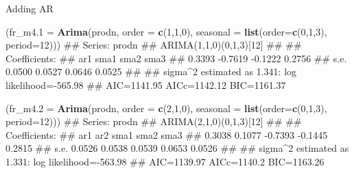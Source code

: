 \documentclass[11pt,ignorenonframetext,]{beamer}
\newenvironment{Shaded}{}{}
\newcommand{\KeywordTok}[1]{\textcolor[rgb]{0.00,0.44,0.13}{\textbf{#1}}}
\newcommand{\DataTypeTok}[1]{\textcolor[rgb]{0.56,0.13,0.00}{#1}}
\newcommand{\DecValTok}[1]{\textcolor[rgb]{0.25,0.63,0.44}{#1}}
\newcommand{\NormalTok}[1]{#1}
\let\oldShaded\Shaded
\let\endoldShaded\endShaded
\renewenvironment{Shaded}{\footnotesize\begin{spacing}{0.9}\oldShaded}{\endoldShaded\end{spacing}}
\let\oldverbatim\verbatim
\let\endoldverbatim\endverbatim
\newcommand{\scriptoutput}{
  \renewenvironment{Shaded}{\scriptsize\begin{spacing}{0.9}\oldShaded}{\endoldShaded\end{spacing}}
  \renewenvironment{verbatim}{\scriptsize\begin{spacing}{0.9}\oldverbatim}{\endoldverbatim\end{spacing}}
}
\begin{document}
\begin{frame}[fragile]{Adding AR}

\scriptoutput

\begin{Shaded}
\begin{Highlighting}[]
\NormalTok{(}\DataTypeTok{fr_m4.1 =} \KeywordTok{Arima}\NormalTok{(prodn, }\DataTypeTok{order =} \KeywordTok{c}\NormalTok{(}\DecValTok{1}\NormalTok{,}\DecValTok{1}\NormalTok{,}\DecValTok{0}\NormalTok{), }
            \DataTypeTok{seasonal =} \KeywordTok{list}\NormalTok{(}\DataTypeTok{order=}\KeywordTok{c}\NormalTok{(}\DecValTok{0}\NormalTok{,}\DecValTok{1}\NormalTok{,}\DecValTok{3}\NormalTok{), }\DataTypeTok{period=}\DecValTok{12}\NormalTok{)))}
\NormalTok{## Series: prodn }
\NormalTok{## ARIMA(1,1,0)(0,1,3)[12]                    }
\NormalTok{## }
\NormalTok{## Coefficients:}
\NormalTok{##          ar1     sma1     sma2    sma3}
\NormalTok{##       0.3393  -0.7619  -0.1222  0.2756}
\NormalTok{## s.e.  0.0500   0.0527   0.0646  0.0525}
\NormalTok{## }
\NormalTok{## sigma^2 estimated as 1.341:  log likelihood=-565.98}
\NormalTok{## AIC=1141.95   AICc=1142.12   BIC=1161.37}
\end{Highlighting}
\end{Shaded}

\begin{Shaded}
\begin{Highlighting}[]
\NormalTok{(}\DataTypeTok{fr_m4.2 =} \KeywordTok{Arima}\NormalTok{(prodn, }\DataTypeTok{order =} \KeywordTok{c}\NormalTok{(}\DecValTok{2}\NormalTok{,}\DecValTok{1}\NormalTok{,}\DecValTok{0}\NormalTok{), }
            \DataTypeTok{seasonal =} \KeywordTok{list}\NormalTok{(}\DataTypeTok{order=}\KeywordTok{c}\NormalTok{(}\DecValTok{0}\NormalTok{,}\DecValTok{1}\NormalTok{,}\DecValTok{3}\NormalTok{), }\DataTypeTok{period=}\DecValTok{12}\NormalTok{)))}
\NormalTok{## Series: prodn }
\NormalTok{## ARIMA(2,1,0)(0,1,3)[12]                    }
\NormalTok{## }
\NormalTok{## Coefficients:}
\NormalTok{##          ar1     ar2     sma1     sma2    sma3}
\NormalTok{##       0.3038  0.1077  -0.7393  -0.1445  0.2815}
\NormalTok{## s.e.  0.0526  0.0538   0.0539   0.0653  0.0526}
\NormalTok{## }
\NormalTok{## sigma^2 estimated as 1.331:  log likelihood=-563.98}
\NormalTok{## AIC=1139.97   AICc=1140.2   BIC=1163.26}
\end{Highlighting}
\end{Shaded}

\end{frame}
\end{document}
